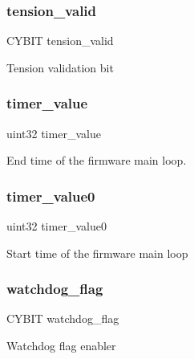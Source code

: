 \subsubsection{tension\+\_\+valid}
{\footnotesize\ttfamily C\+Y\+B\+IT tension\+\_\+valid}

Tension validation bit \mbox{\label{globals_8c_ad47cd0e4d0fcf5739a88e52e949a8084}} 
\subsubsection{timer\+\_\+value}
{\footnotesize\ttfamily uint32 timer\+\_\+value}

End time of the firmware main loop. \mbox{\label{globals_8c_a9bab7f1b1cf2ba38d5968eee42644c32}} 
\subsubsection{timer\+\_\+value0}
{\footnotesize\ttfamily uint32 timer\+\_\+value0}

Start time of the firmware main loop \mbox{\label{globals_8c_a156a860c465529ff2f515725ab816a58}} 
\subsubsection{watchdog\+\_\+flag}
{\footnotesize\ttfamily C\+Y\+B\+IT watchdog\+\_\+flag}

Watchdog flag enabler 